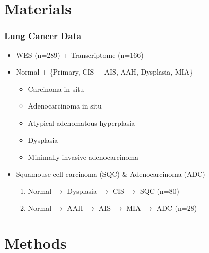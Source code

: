 \documentclass{beamer}
\begin{document}
    \section{Materials}
    \begin{frame}
        \frametitle{Lung Cancer Data}

        \begin{itemize}
            \item WES (n=289) + Transcriptome (n=166)
            \item Normal + \{Primary, CIS + AIS, AAH, Dysplasia, MIA\}
            \begin{itemize}
                \item Carcinoma in situ
                \item Adenocarcinoma in situ
                \item Atypical adenomatous hyperplasia
                \item Dysplasia
                \item Minimally invasive adenocarcinoma
            \end{itemize}
            \item Squamouse cell carcinoma (SQC) \& Adenocarcinoma (ADC)
            \begin{enumerate}
                \item Normal $\rightarrow$ Dysplasia $\rightarrow$ CIS $\rightarrow$ SQC (n=80)
                \item Normal $\rightarrow$ AAH $\rightarrow$ AIS $\rightarrow$ MIA $\rightarrow$ ADC (n=28)
            \end{enumerate}
        \end{itemize}
    \end{frame}

    \section{Methods}
\end{document}
